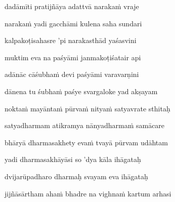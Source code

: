 dadāmīti pratijñāya adattvā narakaṁ vraje \veg\dontdisplaylinenum
{}

narakaṁ yadi gacchāmi kulena saha sundari\thinspace{\dandab} \dontdisplaylinenum
{}

kalpakoṭisahasre 'pi narakasthād yaśasvini \veg\dontdisplaylinenum
{}

muktim eva na paśyāmi janmakoṭiśatair api\thinspace{\dandab} \dontdisplaylinenum
{}

adānāc cāśubhaṁ devi paśyāmi varavarṇini \veg\dontdisplaylinenum
{}

dānena tu śubhaṁ paśye svargaloke yad akṣayam\thinspace{\dandab} \dontdisplaylinenum
{}

noktaṁ mayāntaṁ pūrvaṁ nityaṁ satyavrate sthitaḥ \veg\dontdisplaylinenum
{}

satyadharmam atikramya nānyadharmaṁ samācare\thinspace{\dandab} \dontdisplaylinenum
{}

bhāryā dharmasakhety evaṁ tvayā pūrvam udāhtam \veg\dontdisplaylinenum
{}

yadi dharmasakhāyāsi so 'dya kāla ihāgataḥ\thinspace{\dandab} \dontdisplaylinenum
{}

dvijarūpadharo dharmaḥ svayam eva ihāgataḥ \veg\dontdisplaylinenum
{}

jijñāsārtham ahaṁ bhadre na vighnaṁ kartum arhasi\thinspace{\dandab} \dontdisplaylinenum
{}

